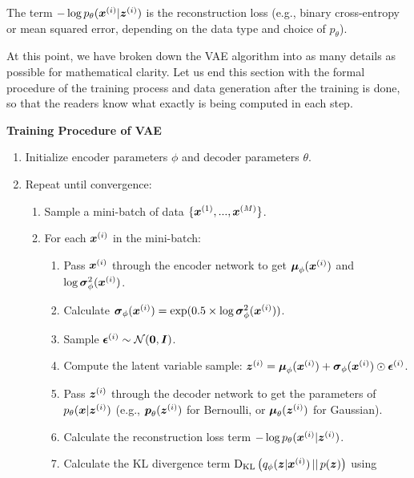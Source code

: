 The term $-\log p_{\theta}(\boldsymbol{x}^{(i)}|\boldsymbol{z}^{(i)})$ is the reconstruction loss
(e.g., binary cross-entropy or mean squared error, depending on the data type
and choice of $p_{\theta}$).

At this point, we have broken down the VAE algorithm into as many details as
possible for mathematical clarity. Let us end this section with the formal
procedure of the training process and data generation after the training is
done, so that the readers know what exactly is being computed in each step.

\textbf{Training Procedure of VAE}
\begin{enumerate}
    \item Initialize encoder parameters $\phi$ and decoder parameters $\theta$.
    \item Repeat until convergence:
          \begin{enumerate}
              \item Sample a mini-batch of data $\{\boldsymbol{x}^{(1)}, ..., \boldsymbol{x}^{(M)}\}$.
              \item For each $\boldsymbol{x}^{(i)}$ in the mini-batch:
                    \begin{enumerate}
                        \item Pass $\boldsymbol{x}^{(i)}$ through the encoder network to get $\boldsymbol{\mu}_{\phi}(\boldsymbol{x}^{(i)})$
                              and $\log \boldsymbol{\sigma}^2_{\phi}(\boldsymbol{x}^{(i)})$.
                        \item Calculate $\boldsymbol{\sigma}_{\phi}(\boldsymbol{x}^{(i)}) = \exp(0.5 \times \log
                                  \boldsymbol{\sigma}^2_{\phi}(\boldsymbol{x}^{(i)}))$.
                        \item Sample $\boldsymbol{\epsilon}^{(i)} \sim \mathcal{N}(\mathbf{0}, \boldsymbol{I})$.
                        \item Compute the latent variable sample: $\boldsymbol{z}^{(i)} = \boldsymbol{\mu}_{\phi}(\boldsymbol{x}^{(i)}) +
                                  \boldsymbol{\sigma}_{\phi}(\boldsymbol{x}^{(i)}) \odot \boldsymbol{\epsilon}^{(i)}$.
                        \item Pass $\boldsymbol{z}^{(i)}$ through the decoder network to get the parameters of
                              $p_{\theta}(\boldsymbol{x}|\boldsymbol{z}^{(i)})$ (e.g., $\boldsymbol{p}_{\theta}(\boldsymbol{z}^{(i)})$ for
                              Bernoulli, or $\boldsymbol{\mu}_{\theta}(\boldsymbol{z}^{(i)})$ for Gaussian).
                        \item Calculate the reconstruction loss term $-\log p_{\theta}(\boldsymbol{x}^{(i)}|\boldsymbol{z}^{(i)})$.
                        \item Calculate the KL divergence term $\text{D}_{\text{KL}}\left(q_{\phi}(\boldsymbol{z}|\boldsymbol{x}^{(i)}) \,||\, p(\boldsymbol{z})\right)$ using

\end{enumerate}
\end{enumerate}
\end{enumerate}
